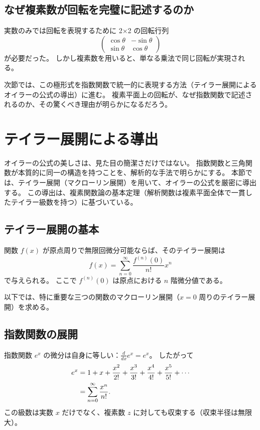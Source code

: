 \documentclass[dvipdfmx,a4paper]{jsbook}
\theoremstyle{definition}
\theoremstyle{remark}
\begin{document}
\subsection{なぜ複素数が回転を完璧に記述するのか}

実数のみでは回転を表現するために 2×2 の回転行列
\begin{equation}
  \begin{pmatrix}
    \cos\theta & -\sin\theta \\
    \sin\theta & \cos\theta
  \end{pmatrix}
\end{equation}
が必要だった。
しかし複素数を用いると、単なる乗法で同じ回転が実現される。

次節では、この極形式を指数関数で統一的に表現する方法（テイラー展開によるオイラーの公式の導出）に進む。
複素平面上の回転が、なぜ指数関数で記述されるのか、その驚くべき理由が明らかになるだろう。

\section{テイラー展開による導出}
\label{sec:taylor-derivation}

オイラーの公式の美しさは、見た目の簡潔さだけではない。
指数関数と三角関数が本質的に同一の構造を持つことを、解析的な手法で明らかにする。
本節では、テイラー展開（マクローリン展開）を用いて、オイラーの公式を厳密に導出する。
この導出は、複素関数論の基本定理（解析関数は複素平面全体で一貫したテイラー級数を持つ）に基づいている。

\subsection{テイラー展開の基本}

関数 $f(x)$ が原点周りで無限回微分可能ならば、そのテイラー展開は
\begin{equation}
  f(x) = \sum_{n=0}^\infty \frac{f^{(n)}(0)}{n!} x^n
\end{equation}
で与えられる。
ここで $f^{(n)}(0)$ は原点における $n$ 階微分値である。

以下では、特に重要な三つの関数のマクローリン展開（$x=0$ 周りのテイラー展開）を求める。

\subsection{指数関数の展開}

指数関数 $e^x$ の微分は自身に等しい：$\frac{d}{dx} e^x = e^x$。
したがって
\begin{align}
  e^x &= 1 + x + \frac{x^2}{2!} + \frac{x^3}{3!} + \frac{x^4}{4!} + \frac{x^5}{5!} + \cdots \notag \\
      &= \sum_{n=0}^\infty \frac{x^n}{n!}.
  \label{eq:exp-taylor}
\end{align}
この級数は実数 $x$ だけでなく、複素数 $z$ に対しても収束する（収束半径は無限大）。
\end{document}
